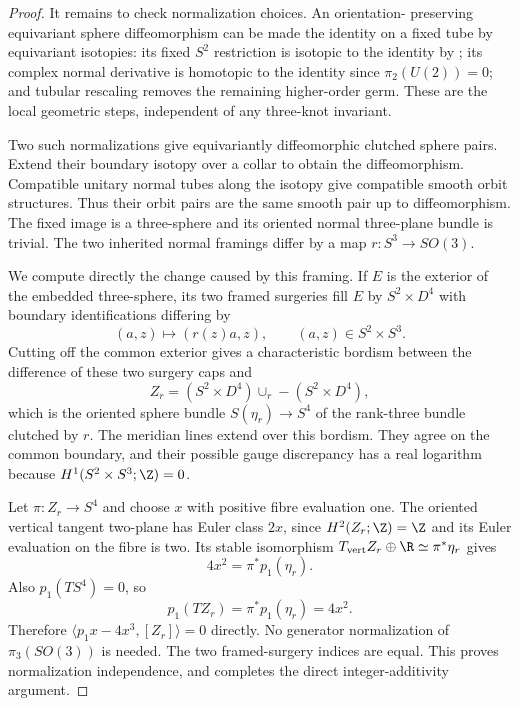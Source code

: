 \begin{proof}
It remains to check normalization choices. An orientation-
preserving equivariant sphere diffeomorphism can be made the
identity on a fixed tube by equivariant isotopies: its fixed
$S^2$ restriction is isotopic to the identity by
\citet[Theorem A]{Smale1959E}; its complex normal derivative
is homotopic to the identity since $\pi_2(U(2))=0$; and
tubular rescaling removes the remaining higher-order germ.
These are the local geometric steps, independent of any
three-knot invariant.

Two such normalizations give equivariantly diffeomorphic
clutched sphere pairs. Extend their boundary isotopy over a
collar to obtain the diffeomorphism. Compatible unitary normal
tubes along the isotopy give compatible smooth orbit structures.
Thus their orbit pairs are the same smooth pair up to
diffeomorphism. The fixed image is a three-sphere and its
oriented normal three-plane bundle is trivial. The two inherited
normal framings differ by a map $r:S^3\to SO(3)$.

We compute directly the change caused by this framing. If
$E$ is the exterior of the embedded three-sphere, its two
framed surgeries fill $E$ by $S^2\times D^4$ with boundary
identifications differing by
\[
 (a,z)\longmapsto(r(z)a,z),\qquad(a,z)\in S^2\times S^3.
\]
Cutting off the common exterior gives a characteristic bordism
between the difference of these two surgery caps and
\[
 Z_r=(S^2\times D^4)\cup_r-(S^2\times D^4),
\]
which is the oriented sphere bundle $S(\eta_r)\to S^4$ of
the rank-three bundle clutched by $r$. The meridian lines
extend over this bordism. They agree on the common boundary,
and their possible gauge discrepancy has a real logarithm
because $H^1(S^2\times S^3;\Z)=0$.

Let $\pi:Z_r\to S^4$ and choose $x$ with positive fibre
evaluation one. The oriented vertical tangent two-plane has
Euler class $2x$, since $H^2(Z_r;\Z)=\Z$ and its Euler
evaluation on the fibre is two. Its stable isomorphism
$T_{\mathrm{vert}}Z_r\oplus\R\simeq\pi^*\eta_r$ gives
\[
 4x^2=\pi^*p_1(\eta_r).
\]
Also $p_1(TS^4)=0$, so
\[
 p_1(TZ_r)=\pi^*p_1(\eta_r)=4x^2.
\]
Therefore $\langle p_1x-4x^3,[Z_r]\rangle=0$ directly.
No generator normalization of $\pi_3(SO(3))$ is needed.
The two framed-surgery indices are equal. This proves
normalization independence, and completes the direct
integer-additivity argument.
\end{proof}
